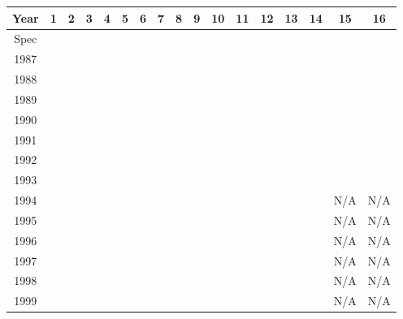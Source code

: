 \begin{center}
    \begin{tabular}{c|cccccccccccccccc}
        Year & 1     & 2     & 3     & 4     & 5     & 6     & 7     & 8     & 9  & 10 & 11    & 12    & 13    & 14  & 15  & 16  \\
        \hline
        Spec &       &       &       &       &       &       &       &       &    &    &       &       &       &     &     &     \\
        1987 &       &       &       &       &       &       &       &       &    &    &       &       &       &     &     &     \\
        1988 &       &       &       &       &       &       &       &       &    &    &       &       &       &     &     &     \\
        1989 &       &       &       &       &       &       &       &       &    &    &       &       &       &     &     &     \\
        1990 &       &       &       &       &       &       &       &       &    &    &       &       &       &     &     &     \\
        1991 &       &       &       &       &       &       &       &       &    &    &       &       &       &     &     &     \\
        1992 &       &       &       &       &       &       &       &       &    &    &       &       &       &     &     &     \\
        1993 &       &       &       &       &       &       &       &       &    &    &       &       &       &     &     &     \\
        1994 &       &       &       &       &       &       &       &       &    &    &       &       &       &     & N/A & N/A \\
        1995 &       &       &       &       &       &       &       &       &    &    &       &       &       &     & N/A & N/A \\
        1996 &       &       &       &       &       &       &       &       &    &    &       &       &       &     & N/A & N/A \\
        1997 &       &       &       &       &       &       &       &       &    &    &       &       &       &     & N/A & N/A \\
        1998 &       &       &       &       &       &       &       &       &    &    &       &       &       &     & N/A & N/A \\
        1999 &       &       &       &       &       &       &       &       &    &    &       &       &       &     & N/A & N/A \\

\end{tabular}
\end{center}
